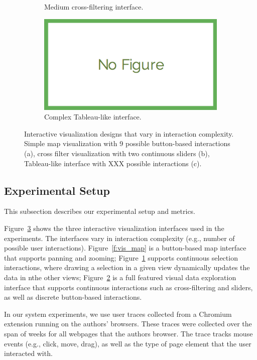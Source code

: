 \begin{figure}
\begin{subfigure}[t]{.32\textwidth}
    \caption{Medium cross-filtering interface.}
    \label{f:vis_xfilter} 
  \end{subfigure}
  \begin{subfigure}[t]{.32\textwidth}
    \includegraphics[width = .99\columnwidth]{figures/nofig}
    \caption{Complex Tableau-like interface.}
    \label{f:vis_tableau} 
  \end{subfigure}
  \caption{Interactive visualization designs that vary in interaction complexity.  
  Simple map visualization with 9 possible button-based interactions (a), cross filter visualization with two continuous sliders (b),
Tableau-like interface with XXX possible interactions (c).}

  \label{f:interfaces}
\end{figure}



\subsection{Experimental Setup}
This subsection describes our experimental setup and metrics.

Figure~\ref{f:interfaces} shows the three interactive visualization interfaces used in the experiments.  The interfaces vary in interaction complexity (e.g., number of possible user interactions).  Figure~\ref{f:vis_map} is a button-based map interface that supports panning and zooming;  Figure~\ref{f:vis_xfilter} supports continuous selection interactions, where drawing a selection in a given view dynamically updates the data in nthe other views; Figure~\ref{f:vis_tableau} is a full featured visual data exploration interface that supports continuous interactions such as cross-filtering and sliders, as well as discrete button-based interactions.

In our system experiments, we use  user traces collected from a Chromium extension running on the authors' browsers.  These traces were collected over the span of  weeks for all webpages that the authors browser.  The trace tracks mouse events (e.g., click, move, drag), as well as the type of page element that the user interacted with. 

